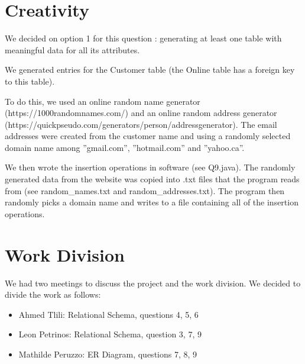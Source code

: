 \documentclass[a4paper,11pt]{article}
\begin{document}
\section{Creativity}

We decided on option 1 for this question : generating at least one table with meaningful data
for all its attributes.

We generated entries for the Customer table (the Online table has a foreign key to this
table).

To do this, we used an online random name generator (https://1000randomnames.com/)
and an online random address generator (https://quickpseudo.com/generators/person/addressgenerator).
The email addresses were created from the customer name and using a randomly
selected domain name among ”gmail.com”, ”hotmail.com” and ”yahoo.ca”.

We then wrote the insertion operations in software (see Q9.java). The randomly generated
data from the website was copied into .txt files that the program reads from (see random\_names.txt and random\_addresses.txt). The program then randomly picks a domain name
and writes to a file containing all of the insertion operations.

\section{Work Division}
We had two meetings to discuss the project and the work division. We decided to divide the work as follows:
\begin{itemize}
    \item Ahmed Tlili: Relational Schema, questions 4, 5, 6
    \item Leon Petrinos: Relational Schema, question 3, 7, 9
    \item Mathilde Peruzzo: ER Diagram, questions 7, 8, 9
\end{itemize}
\end{document}
